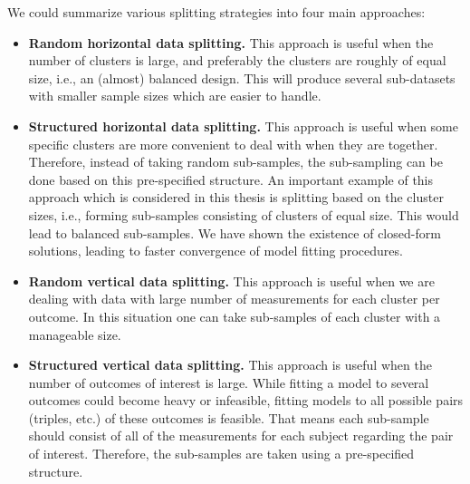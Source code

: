 \documentclass[14pt]{article}
\begin{document}
We could summarize various splitting strategies into four main approaches:
\begin{itemize}
\item \textbf{Random horizontal data splitting.} This approach is useful when the number of clusters is large, and preferably the clusters are roughly of equal size, i.e., an (almost) balanced design. This will produce several sub-datasets with smaller sample sizes which are easier to handle.
\item \textbf{Structured horizontal data splitting.} This approach is useful when some specific clusters are more convenient to deal with when they are together. Therefore, instead of taking random sub-samples, the sub-sampling can be done based on this pre-specified structure. An important example of this approach which is considered in this thesis is splitting based on the cluster sizes, i.e., forming sub-samples consisting of clusters of equal size. This would lead to balanced sub-samples. We have shown the existence of closed-form solutions, leading to faster convergence of model fitting procedures.
\item \textbf{Random vertical data splitting.} This approach is useful when we are dealing with data with large number of measurements for each cluster per outcome. In this situation one can take sub-samples of each cluster with a manageable size. 
\item \textbf{Structured vertical data splitting.} This approach is useful when the number of outcomes of interest is large. While fitting a model to several outcomes could become heavy or infeasible, fitting models to all possible pairs (triples, etc.) of these outcomes is feasible. That means each sub-sample should consist of all of the measurements for each subject regarding the pair of interest. Therefore, the sub-samples are taken using a pre-specified structure.
\end{itemize}
\end{document}
